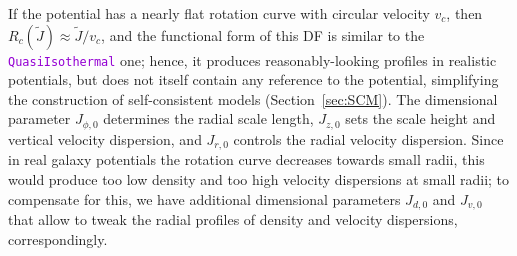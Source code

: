 \documentclass[12pt]{article}
\newcommand{\ttt}[1]{\textcolor{darkviolet}{\texttt{#1}}}
\begin{document}
If the potential has a nearly flat rotation curve with circular velocity $v_c$, then $R_c(\tilde J) \approx \tilde J/v_c$, and the functional form of this DF is similar to the \ttt{QuasiIsothermal} one; hence, it produces reasonably-looking profiles in realistic potentials, but does not itself contain any reference to the potential, simplifying the construction of self-consistent models (Section~\ref{sec:SCM}). The dimensional parameter $J_{\phi,0}$ determines the radial scale length, $J_{z,0}$ sets the scale height and vertical velocity dispersion, and $J_{r,0}$ controls the radial velocity dispersion. Since in real galaxy potentials the rotation curve decreases towards small radii, this would produce too low density and too high velocity dispersions at small radii; to compensate for this, we have additional dimensional parameters $J_{d,0}$ and $J_{v,0}$ that allow to tweak the radial profiles of density and velocity dispersions, correspondingly.
\end{document}
